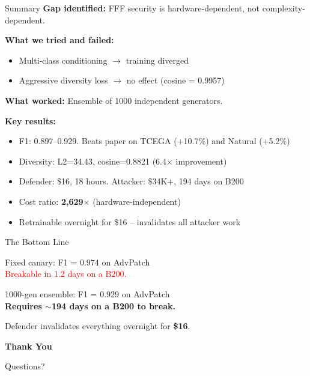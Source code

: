 \documentclass[aspectratio=169,11pt]{beamer}
\begin{document}
\begin{frame}{Summary}
\textbf{Gap identified:} FFF security is hardware-dependent, not complexity-dependent.

\vspace{0.3cm}
\textbf{What we tried and failed:}
\begin{itemize}
    \item Multi-class conditioning $\to$ training diverged
    \item Aggressive diversity loss $\to$ no effect (cosine = 0.9957)
\end{itemize}

\vspace{0.3cm}
\textbf{What worked:} Ensemble of 1000 independent generators.

\vspace{0.3cm}
\textbf{Key results:}
\begin{itemize}
    \item F1: 0.897--0.929. Beats paper on TCEGA (+10.7\%) and Natural (+5.2\%)
    \item Diversity: L2=34.43, cosine=0.8821 (6.4$\times$ improvement)
    \item Defender: \$16, 18 hours. Attacker: \$34K+, 194 days on B200
    \item Cost ratio: \textbf{2,629$\times$} (hardware-independent)
    \item Retrainable overnight for \$16 -- invalidates all attacker work
\end{itemize}
\end{frame}

\begin{frame}{The Bottom Line}
\begin{center}
\Large
\vspace{1cm}
Fixed canary: F1 = 0.974 on AdvPatch\\
\textcolor{red}{Breakable in 1.2 days on a B200.}

\vspace{1cm}
1000-gen ensemble: F1 = 0.929 on AdvPatch\\
\textcolor{green!60!black}{\textbf{Requires $\sim$194 days on a B200 to break.}}

\vspace{1cm}
Defender invalidates everything overnight for \textbf{\$16}.
\end{center}
\end{frame}

\begin{frame}
\begin{center}
\Huge
\textbf{Thank You}

\vspace{1cm}
\Large
Questions?
\end{center}
\end{frame}
\end{document}
